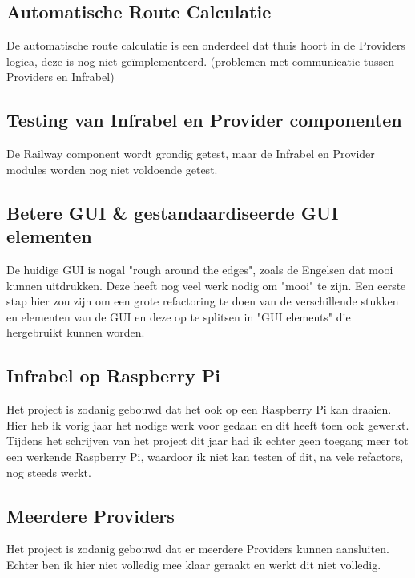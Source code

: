 \documentclass[a4paper, 11pt]{article}
\newcommand{\<}{\scriptsize\textless\normalsize}
\renewcommand{\>}{\scriptsize\textgreater\normalsize}
\begin{document}
\subsection{Automatische Route Calculatie}
De automatische route calculatie is een onderdeel dat thuis hoort in de Providers logica, deze is nog niet ge\"implementeerd. (problemen met communicatie tussen Providers en Infrabel)
\subsection{Testing van Infrabel en Provider componenten}
De Railway component wordt grondig getest, maar de Infrabel en Provider modules worden nog niet voldoende getest.
\subsection{Betere GUI \& gestandaardiseerde GUI elementen}
De huidige GUI is nogal "rough around the edges", zoals de Engelsen dat mooi kunnen uitdrukken. Deze heeft nog veel werk nodig om "mooi" te zijn. Een eerste stap hier zou zijn om een grote refactoring te doen van de verschillende stukken en elementen van de GUI en deze op te splitsen in "GUI elements" die hergebruikt kunnen worden.
\subsection{Infrabel op Raspberry Pi}
Het project is zodanig gebouwd dat het ook op een Raspberry Pi kan draaien. Hier heb ik vorig jaar het nodige werk voor gedaan en dit heeft toen ook gewerkt. Tijdens het schrijven van het project dit jaar had ik echter geen toegang meer tot een werkende Raspberry Pi, waardoor ik niet kan testen of dit, na vele refactors, nog steeds werkt.\\
\subsection{Meerdere Providers}
Het project is zodanig gebouwd dat er meerdere Providers kunnen aansluiten. Echter ben ik hier niet volledig mee klaar geraakt en werkt dit niet volledig.

\label{lastpage}
\end{document}
